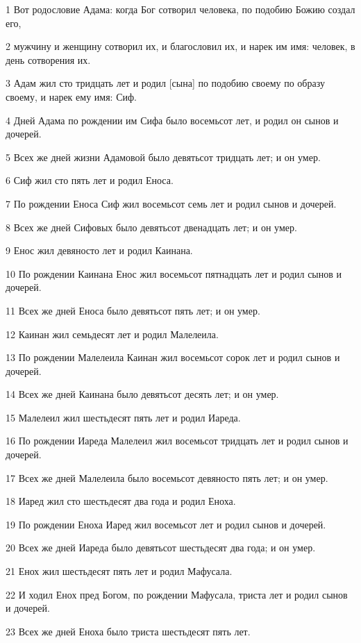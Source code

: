\par 1 Вот родословие Адама: когда Бог сотворил человека, по подобию Божию создал его,
\par 2 мужчину и женщину сотворил их, и благословил их, и нарек им имя: человек, в день сотворения их.
\par 3 Адам жил сто тридцать лет и родил [сына] по подобию своему по образу своему, и нарек ему имя: Сиф.
\par 4 Дней Адама по рождении им Сифа было восемьсот лет, и родил он сынов и дочерей.
\par 5 Всех же дней жизни Адамовой было девятьсот тридцать лет; и он умер.
\par 6 Сиф жил сто пять лет и родил Еноса.
\par 7 По рождении Еноса Сиф жил восемьсот семь лет и родил сынов и дочерей.
\par 8 Всех же дней Сифовых было девятьсот двенадцать лет; и он умер.
\par 9 Енос жил девяносто лет и родил Каинана.
\par 10 По рождении Каинана Енос жил восемьсот пятнадцать лет и родил сынов и дочерей.
\par 11 Всех же дней Еноса было девятьсот пять лет; и он умер.
\par 12 Каинан жил семьдесят лет и родил Малелеила.
\par 13 По рождении Малелеила Каинан жил восемьсот сорок лет и родил сынов и дочерей.
\par 14 Всех же дней Каинана было девятьсот десять лет; и он умер.
\par 15 Малелеил жил шестьдесят пять лет и родил Иареда.
\par 16 По рождении Иареда Малелеил жил восемьсот тридцать лет и родил сынов и дочерей.
\par 17 Всех же дней Малелеила было восемьсот девяносто пять лет; и он умер.
\par 18 Иаред жил сто шестьдесят два года и родил Еноха.
\par 19 По рождении Еноха Иаред жил восемьсот лет и родил сынов и дочерей.
\par 20 Всех же дней Иареда было девятьсот шестьдесят два года; и он умер.
\par 21 Енох жил шестьдесят пять лет и родил Мафусала.
\par 22 И ходил Енох пред Богом, по рождении Мафусала, триста лет и родил сынов и дочерей.
\par 23 Всех же дней Еноха было триста шестьдесят пять лет.
